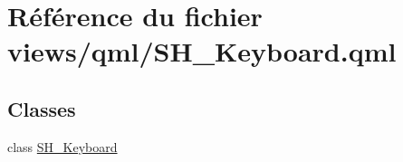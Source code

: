 \hypertarget{SH__Keyboard_8qml}{\section{Référence du fichier views/qml/\-S\-H\-\_\-\-Keyboard.qml}
\label{SH__Keyboard_8qml}
}
\subsection*{Classes}
\begin{DoxyCompactItemize}
\item 
class \hyperlink{classSH__Keyboard}{S\-H\-\_\-\-Keyboard}
\end{DoxyCompactItemize}
